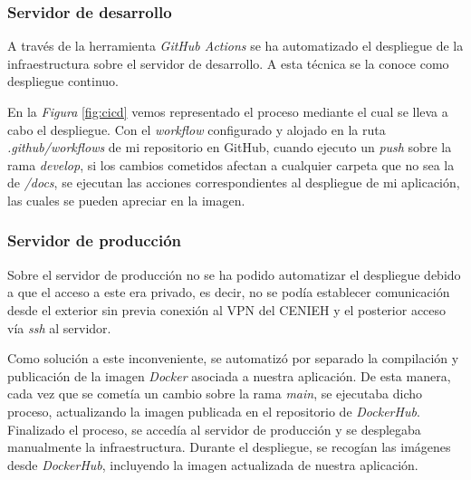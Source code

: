 \subsubsection{Servidor de desarrollo}

A través de la herramienta \emph{GitHub Actions} se ha automatizado el
despliegue de la infraestructura sobre el servidor de desarrollo. A esta
técnica se la conoce como despliegue continuo.


En la \emph{Figura} \ref{fig:cicd} vemos representado el proceso mediante el cual se lleva
a cabo el despliegue. Con el \emph{workflow} configurado y alojado en la
ruta \emph{.github/workflows} de mi repositorio en GitHub, cuando
ejecuto un \emph{push} sobre la rama \emph{develop}, si los cambios
cometidos afectan a cualquier carpeta que no sea la de \emph{/docs}, se
ejecutan las acciones correspondientes al despliegue de mi aplicación,
las cuales se pueden apreciar en la imagen.

\subsubsection{Servidor de producción}

Sobre el servidor de producción no se ha podido automatizar el
despliegue debido a que el acceso a este era privado, es decir, no se
podía establecer comunicación desde el exterior sin previa conexión al
VPN del CENIEH y el posterior acceso vía \emph{ssh} al servidor.


Como solución a este inconveniente, se automatizó por separado la
compilación y publicación de la imagen \emph{Docker} asociada a nuestra
aplicación. De esta manera, cada vez que se cometía un cambio sobre la
rama \emph{main}, se ejecutaba dicho proceso, actualizando la imagen
publicada en el repositorio de \emph{DockerHub}. Finalizado el proceso,
se accedía al servidor de producción y se desplegaba manualmente la
infraestructura. Durante el despliegue, se recogían las imágenes desde
\emph{DockerHub}, incluyendo la imagen actualizada de nuestra
aplicación.
